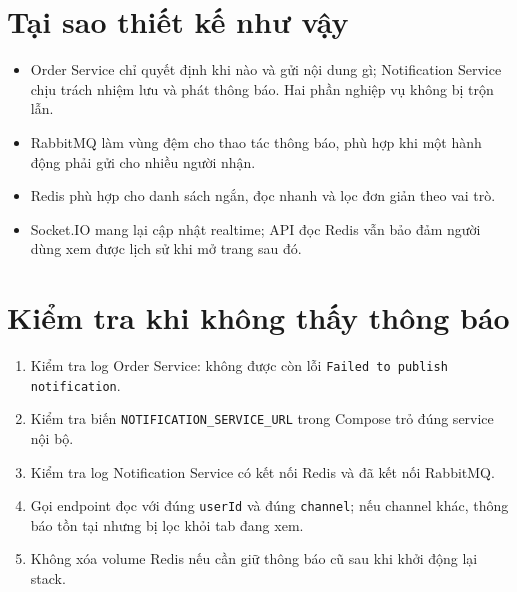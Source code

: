 \documentclass[12pt]{article}
\begin{document}
\section{Tại sao thiết kế như vậy}
\begin{itemize}
  \item Order Service chỉ quyết định khi nào và gửi nội dung gì; Notification Service chịu trách nhiệm lưu và phát thông báo. Hai phần nghiệp vụ không bị trộn lẫn.
  \item RabbitMQ làm vùng đệm cho thao tác thông báo, phù hợp khi một hành động phải gửi cho nhiều người nhận.
  \item Redis phù hợp cho danh sách ngắn, đọc nhanh và lọc đơn giản theo vai trò.
  \item Socket.IO mang lại cập nhật realtime; API đọc Redis vẫn bảo đảm người dùng xem được lịch sử khi mở trang sau đó.
\end{itemize}

\section{Kiểm tra khi không thấy thông báo}
\begin{enumerate}
  \item Kiểm tra log Order Service: không được còn lỗi \texttt{Failed to publish notification}.
  \item Kiểm tra biến \texttt{NOTIFICATION\_SERVICE\_URL} trong Compose trỏ đúng service nội bộ.
  \item Kiểm tra log Notification Service có kết nối Redis và đã kết nối RabbitMQ.
  \item Gọi endpoint đọc với đúng \texttt{userId} và đúng \texttt{channel}; nếu channel khác, thông báo tồn tại nhưng bị lọc khỏi tab đang xem.
  \item Không xóa volume Redis nếu cần giữ thông báo cũ sau khi khởi động lại stack.
\end{enumerate}
\end{document}
